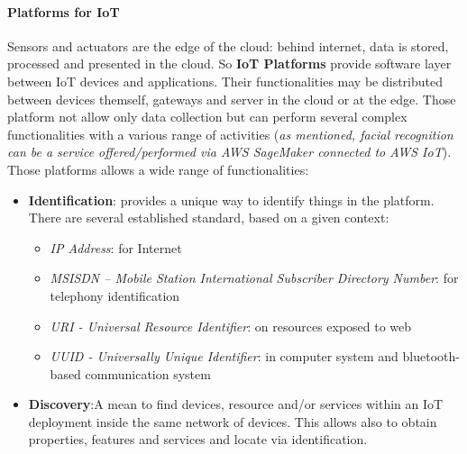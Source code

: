 \documentclass[10pt,a4paper]{report}
\theoremstyle{definition}
\begin{document}
\paragraph{Platforms for IoT}\label{sec:platforms-for-iot}
Sensors and actuators are the edge of the cloud: behind internet, data is stored, processed and presented in the cloud. So \textbf{IoT Platforms} provide software layer between IoT devices and applications. Their functionalities may be distributed between devices themself, gateways and server in the cloud or at the edge.
Those platform not allow only data collection but can perform several complex functionalities with a various range of activities (\textit{as mentioned, facial recognition can be a service offered/performed via AWS SageMaker connected to AWS IoT}).
Those platforms allows a wide range of functionalities:
\begin{itemize}
	\item 
	\textbf{Identification}: provides a unique way to identify things in the platform. There are several established standard, based on a given context:
	\begin{itemize}
		\item 
		\textit{IP Address}: for Internet
		\item 
		\textit{MSISDN – Mobile Station International Subscriber Directory Number}: for telephony identification
		\item 
		\textit{URI - Universal Resource Identifier}: on resources exposed to web
		\item 
		\textit{UUID - Universally Unique Identifier}: in computer system and bluetooth-based communication system
	\end{itemize}
	\item 
	\textbf{Discovery}:A mean to find devices, resource and/or services within an IoT deployment inside the same network of devices. This allows also to obtain properties, features and services and locate via identification.


\end{itemize}
\end{document}
